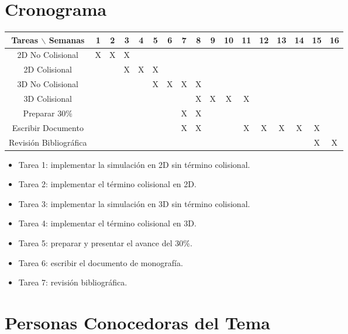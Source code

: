 \documentclass[12pt]{article}
\begin{document}
\section{Cronograma}

\begin{table}[htb]
	\begin{tabular}{|c|cccccccc
	|cccccccc| }
	\hline
	Tareas $\backslash$ Semanas & 1 & 2 & 3 & 4 & 5 & 6 & 7 & 8 & 9 & 10 & 11 & 12 & 13 & 14 & 15 & 16  \\
	\hline
	2D No Colisional & X & X & X  &   &   &   &   &  &  &   &   &   &   &   &   &   \\ \hline
	2D Colisional &   &  & X & X & X &  &  &   &   &  &  &  &   &  &  &   \\ \hline
	3D No Colisional &   &   &   &  & X  & X  & X  & X &   &   &   &  &   &   &  &   \\ \hline
	3D Colisional &  &  &  &  &  &  &  & X & X & X & X &   &   &   &   &   \\ \hline
    Preparar 30$\%$ &  &  &  &  &  &  & X & X &  &  &  &   &   &   &   &   \\ \hline
	Escribir Documento &   &   &   &   &  &   &  X & X  &  &   &  X & X &  X & X  & X &   \\ \hline
	Revisión Bibliográfica &   &   &   &   &  &   &  &  &  &   &  & & &  & X & X  \\	\hline
	\end{tabular}
\end{table}
\vspace{1mm}

\begin{itemize}
	\item Tarea 1: implementar la simulación en 2D sin término colisional.
	\item Tarea 2: implementar el término colisional en 2D.
	\item Tarea 3: implementar la simulación en 3D sin término colisional.
    \item Tarea 4: implementar el término colisional en 3D.
    \item Tarea 5: preparar y presentar el avance del 30\%.
    \item Tarea 6: escribir el documento de monografía.
    \item Tarea 7: revisión bibliográfica.
\end{itemize}

\section{Personas Conocedoras del Tema}
\end{document}
